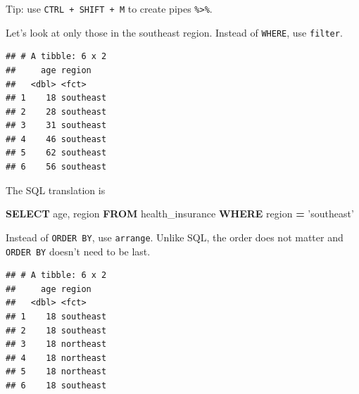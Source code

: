 \documentclass[openany]{book}
\newenvironment{Shaded}{\begin{snugshade}}{\end{snugshade}}
\newcommand{\KeywordTok}[1]{\textcolor[rgb]{0.13,0.29,0.53}{\textbf{#1}}}
\newcommand{\NormalTok}[1]{#1}
\newcommand{\OperatorTok}[1]{\textcolor[rgb]{0.81,0.36,0.00}{\textbf{#1}}}
\newcommand{\StringTok}[1]{\textcolor[rgb]{0.31,0.60,0.02}{#1}}
\begin{document}
Tip: use \texttt{CTRL\ +\ SHIFT\ +\ M} to create pipes \texttt{\%\textgreater{}\%}.

Let's look at only those in the southeast region. Instead of \texttt{WHERE}, use \texttt{filter}.

\begin{Shaded}
\end{Shaded}

\begin{verbatim}
## # A tibble: 6 x 2
##     age region   
##   <dbl> <fct>    
## 1    18 southeast
## 2    28 southeast
## 3    31 southeast
## 4    46 southeast
## 5    62 southeast
## 6    56 southeast
\end{verbatim}

The SQL translation is

\begin{Shaded}
\begin{Highlighting}[]
\KeywordTok{SELECT}\NormalTok{ age, region}
\KeywordTok{FROM}\NormalTok{ health_insurance}
\KeywordTok{WHERE}\NormalTok{ region }\OperatorTok{=} \StringTok{'southeast'}
\end{Highlighting}
\end{Shaded}

Instead of \texttt{ORDER\ BY}, use \texttt{arrange}. Unlike SQL, the order does not matter and \texttt{ORDER\ BY} doesn't need to be last.

\begin{Shaded}
\end{Shaded}

\begin{verbatim}
## # A tibble: 6 x 2
##     age region   
##   <dbl> <fct>    
## 1    18 southeast
## 2    18 southeast
## 3    18 northeast
## 4    18 northeast
## 5    18 northeast
## 6    18 southeast
\end{verbatim}
\end{document}
